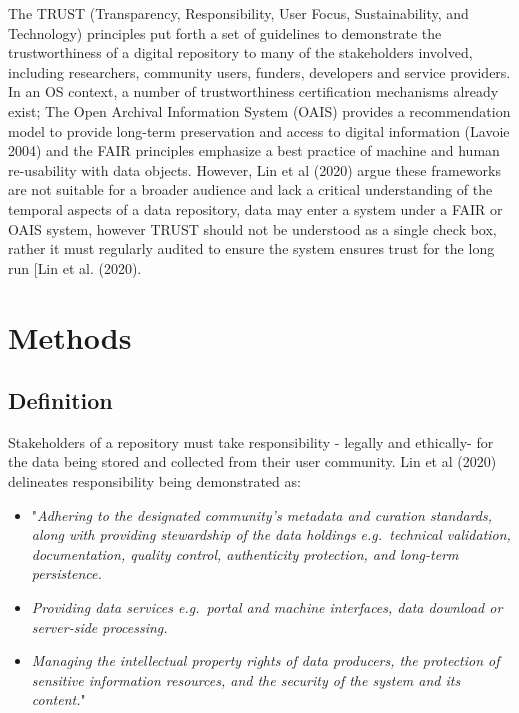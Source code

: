 \documentclass{article}
\begin{document}
The TRUST (Transparency, Responsibility, User Focus, Sustainability, and
Technology) principles put forth a set of guidelines to demonstrate the
trustworthiness of a digital repository to many of the stakeholders
involved, including researchers, community users, funders, developers
and service providers. In an OS context, a number of trustworthiness
certification mechanisms already exist; The Open Archival Information
System (OAIS) provides a recommendation model to provide long-term
preservation and access to digital information (Lavoie 2004) and the
FAIR principles emphasize a best practice of machine and human
re-usability with data objects. However, Lin et al (2020) argue these
frameworks are not suitable for a broader audience and lack a critical
understanding of the temporal aspects of a data repository, data may
enter a system under a FAIR or OAIS system, however TRUST should not be
understood as a single check box, rather it must regularly audited to
ensure the system ensures trust for the long run {[}Lin et al. (2020).

\newpage

\hypertarget{methods}{%
\section{Methods}\label{methods}}

\hypertarget{definition}{%
\subsection{Definition}\label{definition}}

Stakeholders of a repository must take responsibility - legally and
ethically- for the data being stored and collected from their user
community. Lin et al (2020) delineates responsibility being demonstrated
as:

\begin{itemize}
\item
  "\emph{Adhering to the designated community's metadata and curation
  standards, along with providing stewardship of the data holdings
  e.g.~technical validation, documentation, quality control,
  authenticity protection, and long-term persistence.}
\item
  \emph{Providing data services e.g.~portal and machine interfaces, data
  download or server-side processing.}
\item
  \emph{Managing the intellectual property rights of data producers, the
  protection of sensitive information resources, and the security of the
  system and its content.}"
\end{itemize}
\end{document}
